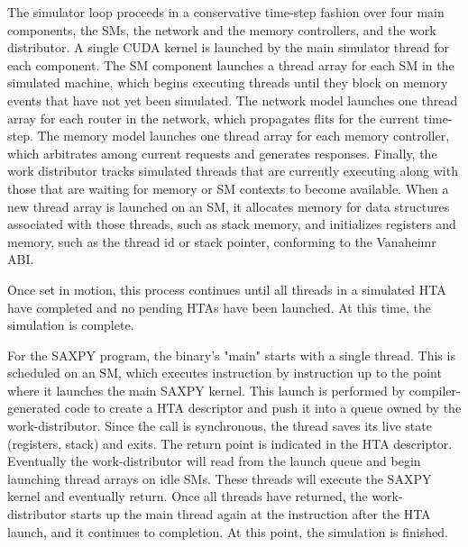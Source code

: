 \documentclass[conference, 10pt]{IEEEtran}
\begin{document}
The simulator loop proceeds in a conservative
time-step fashion over four main components, the SMs, the network and the
memory controllers, and the work distributor.  A single CUDA kernel is launched
by the main simulator thread for each component.  The SM component launches a
thread array for each SM in the simulated machine, which begins executing
threads until they block on memory events that have not yet been simulated. 
The network model launches one thread array for each router in the network,
which propagates flits for the current time-step.  The memory model launches one
thread array for each memory controller, which arbitrates among current requests
and generates responses.  Finally, the work distributor tracks simulated threads
that are currently executing along with those that are waiting for memory or
SM contexts to become available.  When a new thread array is launched on an SM,
it allocates memory for data structures associated with those threads, such as
stack memory, and initializes registers and memory, such as the thread id or
stack pointer, conforming to the Vanaheimr ABI.

Once set in motion, this process continues until all threads in a simulated HTA
have completed and no pending HTAs have been launched.  At this time, the
simulation is complete.

For the SAXPY program, the binary's "main" starts with a single thread.  This is
scheduled on an SM, which executes instruction by instruction up to the point
where it launches the main SAXPY kernel.  This launch is performed by
compiler-generated code to create a HTA descriptor and push it into a queue
owned by the work-distributor.  Since the call is synchronous, the thread
saves its live state (registers, stack) and exits.  The return point is
indicated in the HTA descriptor.  Eventually the work-distributor will read from
the launch queue and begin launching thread arrays on idle SMs.  These threads
will execute the SAXPY kernel and eventually return.  Once all threads have 
returned, the work-distributor starts up the main thread again at the
instruction after the HTA launch, and it continues to completion.  At this
point, the simulation is finished.  


\end{document}
